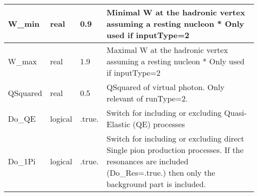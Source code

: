 \documentclass{article}
\begin{document}
\begin{longtable}{llll}
\midrule
W\_min & \begin{minipage}[t]{2cm}real\end{minipage} & \begin{minipage}[t]{2cm}0.9\end{minipage} & \begin{minipage}[t]{12cm}Minimal W at the hadronic vertex assuming a resting nucleon * Only used if inputType=2\end{minipage}\\*
\midrule
W\_max & \begin{minipage}[t]{2cm}real\end{minipage} & \begin{minipage}[t]{2cm}1.9\end{minipage} & \begin{minipage}[t]{12cm}Maximal W at the hadronic vertex assuming a resting nucleon * Only used if inputType=2\end{minipage}\\*
\midrule
QSquared & \begin{minipage}[t]{2cm}real\end{minipage} & \begin{minipage}[t]{2cm}0.5\end{minipage} & \begin{minipage}[t]{12cm}QSquared of virtual photon. Only relevant of runType=2.\end{minipage}\\*
\midrule
Do\_QE & \begin{minipage}[t]{2cm}logical\end{minipage} & \begin{minipage}[t]{2cm}.true.\end{minipage} & \begin{minipage}[t]{12cm}Switch for including or excluding Quasi-Elastic (QE) processes\end{minipage}\\*
\midrule
Do\_1Pi & \begin{minipage}[t]{2cm}logical\end{minipage} & \begin{minipage}[t]{2cm}.true.\end{minipage} & \begin{minipage}[t]{12cm}Switch for including or excluding direct Single pion production processes. If the resonances are included (Do\_Res=.true.) then only the background part is included.\end{minipage}\\*

\end{longtable}
\end{document}
